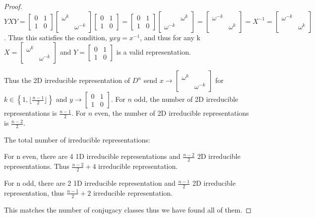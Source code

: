 \documentclass{article}
\newcommand{\floor}[1]{\lfloor{#1}\rfloor}
\begin{document}
\begin{proof}
    $YXY = \begin{bmatrix}
        0 & 1 \\ 1 & 0
    \end{bmatrix}\begin{bmatrix}
        \omega^k & \\
        & \omega^{-k}
    \end{bmatrix}\begin{bmatrix}
        0 & 1 \\ 1 & 0
    \end{bmatrix} = \begin{bmatrix}
        0 & 1 \\ 1 & 0
    \end{bmatrix}\begin{bmatrix}
        & \omega^k \\
        \omega^{-k} & 
    \end{bmatrix} = \begin{bmatrix}
        \omega^{-k} & \\ & \omega^k
    \end{bmatrix} = X^{-1} = \begin{bmatrix}
        \omega^{-k} & \\ & \omega^k
    \end{bmatrix}$. Thus this satisfies the condition, $yxy = x^{-1}$, and thus for any k $X = \begin{bmatrix}
        \omega^k & \\
        & \omega^{-k}
    \end{bmatrix}$ and $Y = \begin{bmatrix}
        0 & 1 \\ 1 & 0
    \end{bmatrix}$ is a valid representation. 
    
    Thus the 2D irreducible representation of $D^n$ send $x \to \begin{bmatrix}
        \omega^k & \\
        & \omega^{-k}
    \end{bmatrix}$ for $k \in \left\{ 1, \floor{\frac{n - 1}{2}} \right\}$ and $y \to \begin{bmatrix}
        0 & 1 \\ 1 & 0
    \end{bmatrix}$. For $n$ odd, the number of 2D irreducible representations is $\frac{n - 1}{2}$. For $n$ even, the number of 2D irreducible representations is $\frac{n - 2}{2}$. 
    
    The total number of irreducible representations:

    For n even, there are 4 1D irreducible representations and $\frac{n - 2}{2}$ 2D irreducible representations. Thus $\frac{n - 2}{2} + 4$ irreducible representation. 
    
    For n odd, there are 2 1D irreducible representation and $\frac{n - 1}{2}$ 2D irreducible representation, thus $\frac{n - 1}{2} + 2$ irreducible representation.
    
    This matches the number of conjugacy classes thus we have found all of them. 

\end{proof}
\end{document}
